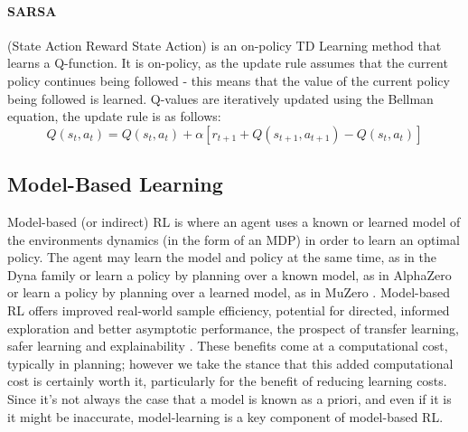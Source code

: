 \paragraph*{SARSA} (State Action Reward State Action) \cite{rummery:cuedtr94} is an on-policy TD Learning method that learns a Q-function. It is on-policy, as the update rule assumes that the current policy continues being followed - this means that the value of the current policy being followed is learned. Q-values are iteratively updated using the Bellman equation, the update rule is as follows:
\begin{equation}
\label{eqn:sarsaupdate}
Q(s_t, a_t) = Q(s_t, a_t) + \alpha[r_{t+1} + Q(s_{t+1}, a_{t+1})-Q(s_t, a_t)]
\end{equation}

\subsection{Model-Based Learning}
Model-based (or indirect) RL is where an agent uses a known or learned model of the environments dynamics (in the form of an MDP) in order to learn an optimal policy. The agent may learn the model and policy at the same time, as in the Dyna family \cite{Sutton:1990, 10.1145/122344.122377} or learn a policy by planning over a known model, as in AlphaZero \cite{DBLP:journals/corr/abs-1712-01815} or learn a policy by planning over a learned model, as in MuZero \cite{DBLP:journals/corr/abs-1911-08265}. Model-based RL offers improved real-world sample efficiency, potential for directed, informed exploration and better asymptotic performance, the prospect of transfer learning, safer learning and explainability \cite{MAL-086}. These benefits come at a computational cost, typically in planning; however we take the stance that this added computational cost is certainly worth it, particularly for the benefit of reducing learning costs. 
Since it's not always the case that a model is known as a priori, and even if it is it might be inaccurate, model-learning is a key component of model-based RL.

